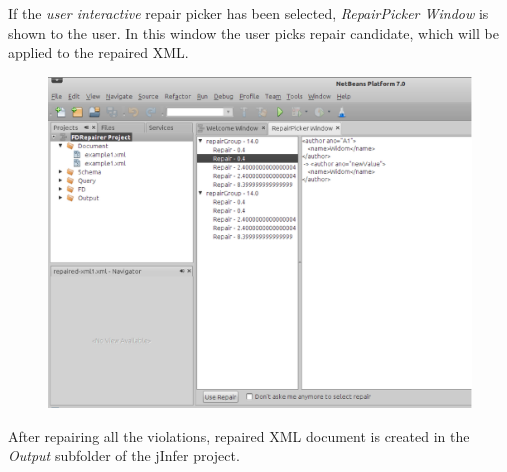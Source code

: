 If the \emph{user interactive} repair picker has been selected, \emph{RepairPicker Window} is shown to the user. In this window the user picks repair candidate, which will be applied to the repaired XML.

\begin{figure}[H]
    \centering\includegraphics[width=\textwidth]{tutorial_images/user_selection}
\end{figure}

After repairing all the violations, repaired XML document is created in the \emph{Output} subfolder of the jInfer project.
